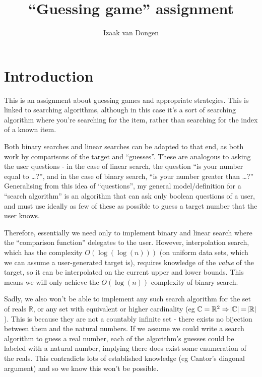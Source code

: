 \documentclass{article}
\title{``Guessing game'' assignment}
\author{Izaak van Dongen}
\begin{document}
    \maketitle
    \tableofcontents
    \lstlistoflistings
    \listoffigures

    \section{Introduction}
    This is an assignment about guessing games and appropriate strategies. This
    is linked to searching algorithms, although in this case it's a sort of
    searching algorithm where you're searching for the item, rather than
    searching for the index of a known item.

    Both binary searches and linear searches can be adapted to that end, as
    both work by comparisons of the target and ``guesses''. These are analogous
    to asking the user questions - in the case of linear search, the question
    ``is your number equal to \ldots?'', and in the case of binary search, ``is
    your number greater than \ldots?'' Generalising from this idea of
    ``questions'', my general model/definition for a ``search algorithm'' is an
    algorithm that can ask only boolean questions of a user, and must use
    ideally as few of these as possible to guess a target number that the user
    knows.

    Therefore, essentially we need only to implement binary and linear search
    where the ``comparison function'' delegates to the user.  However,
    interpolation search, which has the complexity $O(\log(\log(n)))$ (on uniform
    data sets, which we can assume a user-generated target is), requires
    knowledge of the \textit{value} of the target, so it can be interpolated on
    the current upper and lower bounds. This means we will only achieve the
    $O(\log(n))$ complexity of binary search.

    Sadly, we also won't be able to implement any such search algorithm for the
    set of reals $\mathbb{R}$, or any set with equivalent or higher cardinality
    (eg $\mathbb{C} = \mathbb{R}^2 \Rightarrow \abs{\mathbb{C}} =
    \abs{\mathbb{R}}$). This is because they are not a countably infinite set -
    there exists no bijection between them and the natural numbers. If we
    assume we could write a search algorithm to guess a real number, each of
    the algorithm's guesses could be labeled with a natural number, implying
    there does exist some enumeration of the reals. This contradicts lots of
    established knowledge (eg Cantor's diagonal argument)
    and so we know this won't be possible.
\end{document}
